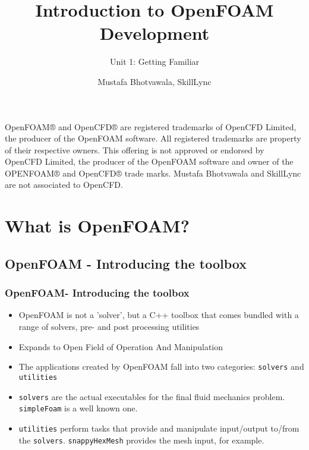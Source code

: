\documentclass[notheorems, aspectratio=169]{beamer}
\title[Introduction to OF Development]{Introduction to OpenFOAM Development}
\subtitle{Unit 1: Getting Familiar}
\author{Mustafa Bhotvawala, SkillLync}
\institute[]{}
\date{}
\begin{document}
\begin{frame}
    \titlepage
\end{frame}

\begin{frame}
  \begin{tcolorbox}
  OpenFOAM® and OpenCFD® are registered trademarks of OpenCFD Limited, the producer of the OpenFOAM software. All registered trademarks are property of their respective owners. This offering is not approved or endorsed by OpenCFD Limited, the producer of the OpenFOAM software and owner of the OPENFOAM® and OpenCFD® trade marks. Mustafa Bhotvawala and SkillLync are not associated to OpenCFD.
  \end{tcolorbox}
\end{frame}



\section{What is OpenFOAM?}
\frame{\tableofcontents[currentsection]}

\subsection{OpenFOAM - Introducing the toolbox}
\begin{frame}
\frametitle{OpenFOAM- Introducing the toolbox}

\begin{itemize}
  \item OpenFOAM is not a 'solver', but a C++ toolbox that comes 
  bundled with a range of solvers, pre- and post processing utilities
  \item Expands to Open Field of Operation And Manipulation
  \item The applications created by OpenFOAM fall into two categories: \texttt{solvers} and \texttt{utilities}
  \item \texttt{solvers} are the actual executables for the final fluid mechanics problem. \texttt{simpleFoam} is a well known one.
  \item \texttt{utilities} perform tasks that provide and manipulate input/output to/from the \texttt{solvers}. \texttt{snappyHexMesh} provides the mesh input, for example.
\end{itemize}


\end{frame}
\end{document}
